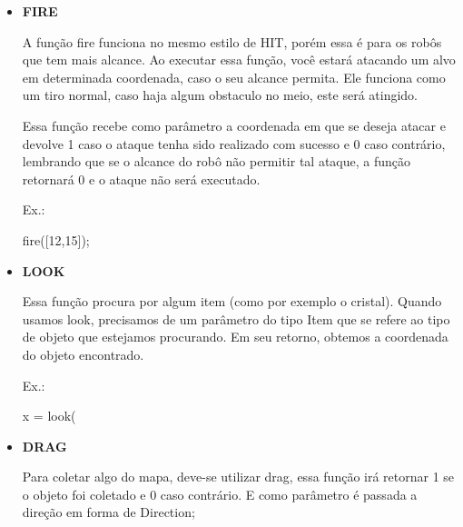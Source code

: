\documentclass[a4paper]{article}
\begin{document}
{{{{{{{{\begin{itemize}
            \textcolor{NavyBlue}{Ex.:}

            move(->E)
            
        \bigskip

        \item \textbf{FIRE}
            
            A função 
            \textcolor{NavyBlue}{fire}
            funciona no mesmo estilo de HIT,
            porém essa é para os robôs que tem mais alcance.
            Ao executar essa função, você estará atacando um
            alvo em determinada coordenada, caso o seu alcance
            permita.
            Ele funciona como um tiro normal, caso haja algum
            obstaculo no meio, este será atingido.
            
            Essa função recebe como parâmetro a coordenada em
            que se deseja atacar e devolve 1 caso o ataque tenha
            sido realizado com sucesso e 0 caso contrário,
            lembrando que se o alcance do robô não permitir tal 
            ataque, a função retornará 0 e o ataque não será
            executado.
            
            \textcolor{NavyBlue}{Ex.:}
            
            fire([12,15]);

        \bigskip
        
        \item \textbf{LOOK}
        
            Essa função procura por algum item (como por exemplo
            o cristal).
            Quando usamos 
            \textcolor{NavyBlue}{look},
            precisamos de um parâmetro do tipo Item que se refere
            ao tipo de objeto que estejamos procurando.
            Em seu retorno, obtemos a coordenada do objeto encontrado.

            \textcolor{NavyBlue}{Ex.:}
            
            x = look( %
        
        \bigskip
        
        \item \textbf{DRAG}
        
            Para coletar algo do mapa, deve-se utilizar
            \textcolor{NavyBlue}{drag},
            essa função irá retornar 1 se o objeto foi
            coletado e 0 caso contrário.
            E como parâmetro é passada a direção em forma
            de Direction;


\end{itemize}}}}}}}}}
\end{document}
